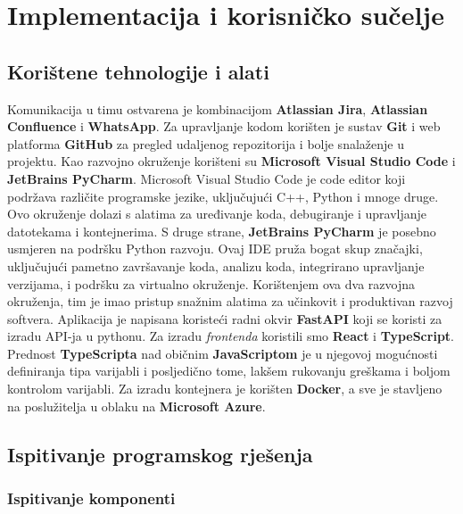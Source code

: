 \chapter{Implementacija i korisničko sučelje}
		
		
		\section{Korištene tehnologije i alati}
		
			Komunikacija u timu ostvarena je kombinacijom \textbf{Atlassian Jira}, \textbf{Atlassian Confluence} i \textbf{WhatsApp}. Za upravljanje kodom korišten je sustav \textbf{Git} i web platforma \textbf{GitHub} za pregled udaljenog repozitorija i bolje snalaženje u projektu.
			Kao razvojno okruženje korišteni su \textbf{Microsoft Visual Studio Code} i \textbf{JetBrains PyCharm}. Microsoft Visual Studio Code je code editor koji podržava različite programske jezike, uključujući C++, Python i mnoge druge. Ovo okruženje dolazi s alatima za uređivanje koda, debugiranje i upravljanje datotekama i kontejnerima.
			S druge strane, \textbf{JetBrains PyCharm} je posebno usmjeren na podršku Python razvoju. Ovaj IDE pruža bogat skup značajki, uključujući pametno završavanje koda, analizu koda, integrirano upravljanje verzijama, i podršku za virtualno okruženje. Korištenjem ova dva razvojna okruženja, tim je imao pristup snažnim alatima za učinkovit i produktivan razvoj softvera.
			Aplikacija je napisana koristeći radni okvir \textbf{FastAPI} koji se koristi za izradu API-ja u pythonu. Za izradu \textit{frontenda} koristili smo \textbf{React} i \textbf{TypeScript}. Prednost \textbf{TypeScripta} nad običnim \textbf{JavaScriptom} je u njegovoj mogućnosti definiranja tipa varijabli i posljedično tome, lakšem rukovanju greškama i boljom kontrolom varijabli.
			Za izradu kontejnera je korišten \textbf{Docker}, a sve je stavljeno na poslužitelja u oblaku na \textbf{Microsoft Azure}.
			
			
			
			\eject 
		
	
		\section{Ispitivanje programskog rješenja}
			
			
			\subsection{Ispitivanje komponenti}
			
